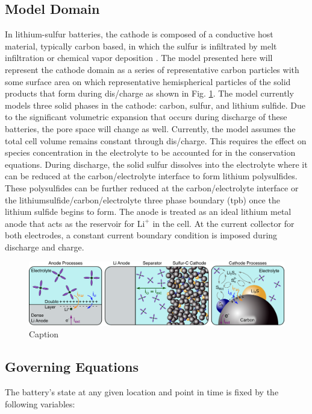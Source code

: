 \documentclass{elsarticle}
\begin{document}
\subsection{Model Domain}

In lithium-sulfur batteries, the cathode is composed of a conductive host material, typically carbon based, in which the sulfur is infiltrated by melt infiltration or chemical vapor deposition \cite{BRUCKNER201482}. The model presented here will represent the cathode domain as a series of representative carbon particles with some surface area on which representative hemispherical particles of the solid products that form during dis/charge as shown in Fig. \ref{fig:modeldomain}. The model currently models three solid phases in the cathode: carbon, sulfur, and lithium sulfide. Due to the significant volumetric expansion that occurs during discharge of these batteries, the pore space will change as well. Currently, the model assumes the total cell volume remains constant through dis/charge. This requires the effect on species concentration in the electrolyte to be accounted for in the conservation equations. During discharge, the solid sulfur dissolves into the electrolyte where it can be reduced at the carbon/electrolyte interface to form lithium polysulfides. These polysulfides can be further reduced at the carbon/electrolyte interface or the lithiumsulfide/carbon/electrolyte three phase boundary (tpb) once the lithium sulfide begins to form. The anode is treated as an ideal lithium metal anode that acts as the reservoir for $\mathrm{Li}^+$ in the cell. At the current collector for both electrodes, a constant current boundary condition is imposed during discharge and charge. 

\begin{center}
\begin{figure}
    \centering
    \includegraphics[width=\textwidth]{Figure1_Simulation_Domain.png}
    \caption{Caption}
    \label{fig:modeldomain}
\end{figure}
\end{center}

\subsection{Governing Equations}
The battery’s state at any given location and point in time is fixed by the following variables:
\end{document}
